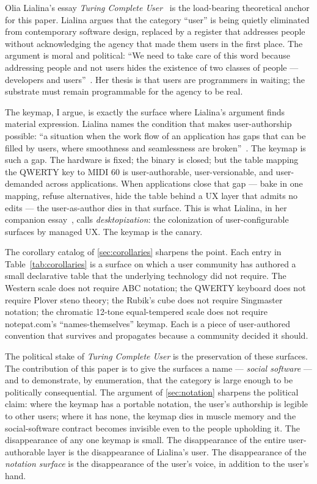 \documentclass[10pt,letterpaper,twocolumn]{article}
\DeclareRobustCommand{\key}[1]{\tikz[baseline=(k.base)]{%
 \node[fill=keystroke, rounded corners=1.3pt, inner xsep=2.4pt,
    inner ysep=1.9pt, anchor=base, yshift=-1.2pt] at (0,0)
  {\footnotesize\ttfamily\bfseries\vphantom{A}\phantom{#1}};
 \node[draw=keystroke, line width=0.4pt, fill=keyfill,
    rounded corners=1.3pt, inner xsep=2.4pt, inner ysep=1.9pt,
    anchor=base] (k) at (0,0)
  {\footnotesize\ttfamily\bfseries\vphantom{A}#1};}}
\begin{document}
Olia Lialina's essay \emph{Turing Complete User}~\citep{lialina2012turing,lialina2021turingbook} is the load-bearing theoretical anchor for this paper. Lialina argues that the category ``user'' is being quietly eliminated from contemporary software design, replaced by a register that addresses people without acknowledging the agency that made them users in the first place. The argument is moral and political: ``We need to take care of this word because addressing people and not users hides the existence of two classes of people --- developers and users''~\citep{lialina2012turing}. Her thesis is that users are programmers in waiting; the substrate must remain programmable for the agency to be real.

The keymap, I argue, is exactly the surface where Lialina's argument finds material expression. Lialina names the condition that makes user-authorship possible: ``a situation when the work flow of an application has gaps that can be filled by users, where smoothness and seamlessness are broken''~\citep{lialina2012turing}. The keymap is such a gap. The hardware is fixed; the binary is closed; but the table mapping the QWERTY key \key{A} to MIDI 60 is user-authorable, user-versionable, and user-demanded across applications. When applications close that gap --- bake in one mapping, refuse alternatives, hide the table behind a UX layer that admits no edits --- the user-as-author dies in that surface. This is what Lialina, in her companion essay~\citep{lialina2018rich}, calls \emph{desktopization}: the colonization of user-configurable surfaces by managed UX. The keymap is the canary.

The corollary catalog of \textsection\ref{sec:corollaries} sharpens the point. Each entry in Table~\ref{tab:corollaries} is a surface on which a user community has authored a small declarative table that the underlying technology did not require. The Western scale does not require ABC notation; the QWERTY keyboard does not require Plover steno theory; the Rubik's cube does not require Singmaster notation; the chromatic 12-tone equal-tempered scale does not require notepat.com's ``names-themselves'' keymap. Each is a piece of user-authored convention that survives and propagates because a community decided it should.

The political stake of \emph{Turing Complete User} is the preservation of these surfaces. The contribution of this paper is to give the surfaces a name --- \emph{social software} --- and to demonstrate, by enumeration, that the category is large enough to be politically consequential. The argument of \textsection\ref{sec:notation} sharpens the political claim: where the keymap has a portable notation, the user's authorship is legible to other users; where it has none, the keymap dies in muscle memory and the social-software contract becomes invisible even to the people upholding it. The disappearance of any one keymap is small. The disappearance of the entire user-authorable layer is the disappearance of Lialina's user. The disappearance of the \emph{notation surface} is the disappearance of the user's voice, in addition to the user's hand.
\end{document}
